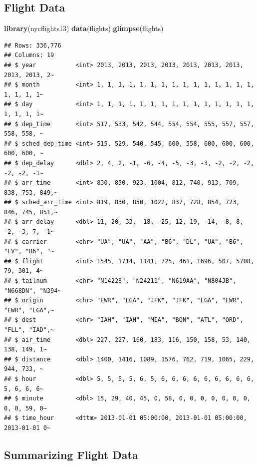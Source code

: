 \documentclass[]{book}
\newenvironment{Shaded}{\begin{snugshade}}{\end{snugshade}}
\newcommand{\KeywordTok}[1]{\textcolor[rgb]{0.13,0.29,0.53}{\textbf{#1}}}
\newcommand{\NormalTok}[1]{#1}
\begin{document}
\subsection{Flight Data}\label{flight-data}

\begin{Shaded}
\begin{Highlighting}[]
\KeywordTok{library}\NormalTok{(nycflights13)}
\KeywordTok{data}\NormalTok{(flights)}
\KeywordTok{glimpse}\NormalTok{(flights)}
\end{Highlighting}
\end{Shaded}

\begin{verbatim}
## Rows: 336,776
## Columns: 19
## $ year           <int> 2013, 2013, 2013, 2013, 2013, 2013, 2013, 2013, 2013, 2~
## $ month          <int> 1, 1, 1, 1, 1, 1, 1, 1, 1, 1, 1, 1, 1, 1, 1, 1, 1, 1, 1~
## $ day            <int> 1, 1, 1, 1, 1, 1, 1, 1, 1, 1, 1, 1, 1, 1, 1, 1, 1, 1, 1~
## $ dep_time       <int> 517, 533, 542, 544, 554, 554, 555, 557, 557, 558, 558, ~
## $ sched_dep_time <int> 515, 529, 540, 545, 600, 558, 600, 600, 600, 600, 600, ~
## $ dep_delay      <dbl> 2, 4, 2, -1, -6, -4, -5, -3, -3, -2, -2, -2, -2, -2, -1~
## $ arr_time       <int> 830, 850, 923, 1004, 812, 740, 913, 709, 838, 753, 849,~
## $ sched_arr_time <int> 819, 830, 850, 1022, 837, 728, 854, 723, 846, 745, 851,~
## $ arr_delay      <dbl> 11, 20, 33, -18, -25, 12, 19, -14, -8, 8, -2, -3, 7, -1~
## $ carrier        <chr> "UA", "UA", "AA", "B6", "DL", "UA", "B6", "EV", "B6", "~
## $ flight         <int> 1545, 1714, 1141, 725, 461, 1696, 507, 5708, 79, 301, 4~
## $ tailnum        <chr> "N14228", "N24211", "N619AA", "N804JB", "N668DN", "N394~
## $ origin         <chr> "EWR", "LGA", "JFK", "JFK", "LGA", "EWR", "EWR", "LGA",~
## $ dest           <chr> "IAH", "IAH", "MIA", "BQN", "ATL", "ORD", "FLL", "IAD",~
## $ air_time       <dbl> 227, 227, 160, 183, 116, 150, 158, 53, 140, 138, 149, 1~
## $ distance       <dbl> 1400, 1416, 1089, 1576, 762, 719, 1065, 229, 944, 733, ~
## $ hour           <dbl> 5, 5, 5, 5, 6, 5, 6, 6, 6, 6, 6, 6, 6, 6, 6, 5, 6, 6, 6~
## $ minute         <dbl> 15, 29, 40, 45, 0, 58, 0, 0, 0, 0, 0, 0, 0, 0, 0, 59, 0~
## $ time_hour      <dttm> 2013-01-01 05:00:00, 2013-01-01 05:00:00, 2013-01-01 0~
\end{verbatim}

\subsection{Summarizing Flight Data}\label{summarizing-flight-data}
\end{document}
